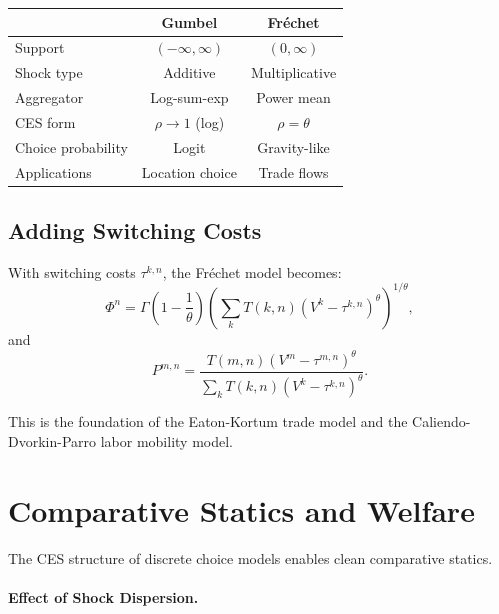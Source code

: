 \begin{calloutimportant}
\begin{center}
\begin{tabular}{lcc}
\toprule
& \textbf{Gumbel} & \textbf{Fréchet} \\
\midrule
Support & $(-\infty, \infty)$ & $(0, \infty)$ \\
Shock type & Additive & Multiplicative \\
Aggregator & Log-sum-exp & Power mean \\
CES form & $\rho \to 1$ (log) & $\rho = \theta$ \\
Choice probability & Logit & Gravity-like \\
Applications & Location choice & Trade flows \\
\bottomrule
\end{tabular}
\end{center}
\end{calloutimportant}

\subsection{Adding Switching Costs}

With switching costs $\tau^{k,n}$, the Fréchet model becomes:
\begin{equation}
\Phi^n = \Gamma\left(1 - \frac{1}{\theta}\right) \left( \sum_k T(k,n) \left( V^k - \tau^{k,n} \right)^\theta \right)^{1/\theta},
\end{equation}
and
\begin{equation}
P^{m,n} = \frac{T(m,n) (V^m - \tau^{m,n})^\theta}{\sum_k T(k,n) (V^k - \tau^{k,n})^\theta}.
\end{equation}

This is the foundation of the Eaton-Kortum trade model and the Caliendo-Dvorkin-Parro labor mobility model.

\section{Comparative Statics and Welfare}
\label{sec:discrete-welfare}

The CES structure of discrete choice models enables clean comparative statics.

\paragraph{Effect of Shock Dispersion.}

